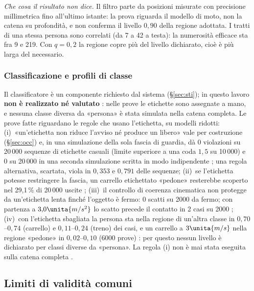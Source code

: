 \emph{Che cosa il risultato non dice.} Il filtro parte da posizioni misurate con precisione millimetrica fino all'ultimo istante: la prova riguarda il modello di moto, non la catena su profondità, e non conferma il livello $0{,}90$ della regione adottata. I tratti di una stessa persona sono correlati (da 7 a 42 a testa): la numerosità efficace sta fra 9 e 219. Con $q=0{,}2$ la regione copre più del livello dichiarato, cioè è più larga del necessario.

\subsubsection*{Classificazione e profili di classe}

Il classificatore è un componente richiesto dal sistema (\S\ref{sec:sti}); in questo lavoro \textbf{non è realizzato né valutato} : nelle prove le etichette sono assegnate a mano, e nessuna classe diversa da «persona» è stata simulata nella catena completa. Le prove fatte riguardano le regole che usano l'etichetta, su modelli ridotti: (i)~«un'etichetta non riduce l'avviso né produce un libero» vale per costruzione (\S\ref{sec:occ}) e, in una simulazione della sola fascia di guardia, dà 0 violazioni su 20\,000 sequenze di etichette casuali (limite superiore a una coda $1{,}5$ su 10\,000) e 0 su 20\,000 in una seconda simulazione scritta in modo indipendente ; una regola alternativa, scartata, viola in $0{,}353$ e $0{,}791$ delle sequenze; (ii)~se l'etichetta potesse restringere la fascia, un carrello etichettato «pedone» resterebbe scoperto nel 29,1\,\% di 20\,000 uscite ; (iii)~il controllo di coerenza cinematica non protegge da un'etichetta lenta finché l'oggetto è fermo: 0 scatti su 2000 da fermo; con partenza a $3{,}0\unita{m/s^2}$ lo scatto precede il contatto in 2 casi su 2000 ; (iv)~con l'etichetta sbagliata la persona sta nella regione di un'altra classe in $0{,}70$–$0{,}74$ (carrello) e $0{,}11$–$0{,}24$ (treno) dei casi, e un carrello a $3\unita{m/s}$ nella regione «pedone» in $0{,}02$–$0{,}10$ (6000 prove) : per questo nessun livello è dichiarato per classi diverse da «persona». La regola (i) non è mai stata eseguita sulla catena completa .

\subsection{Limiti di validità comuni}\label{sec:val-limiti}

